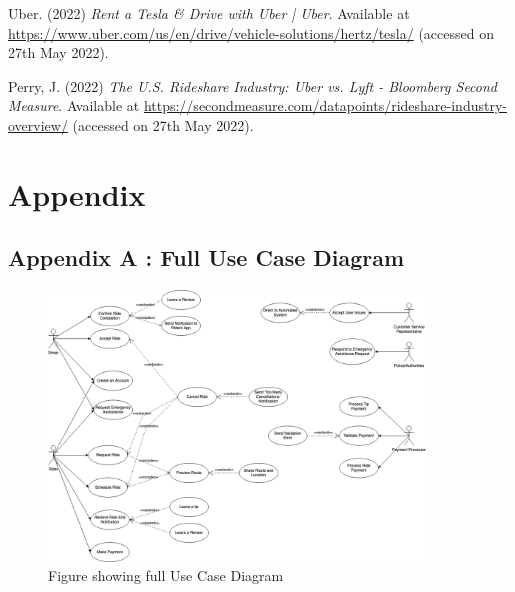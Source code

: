 \documentclass{article}
\begin{document}
    \noindent [1] Uber. (2022) \textit{Rent a Tesla \& Drive with Uber | Uber}. Available at \url{https://www.uber.com/us/en/drive/vehicle-solutions/hertz/tesla/} (accessed on 27th May 2022).
    \vspace{0.2cm}

    \noindent [2] Perry, J. (2022) \textit{The U.S. Rideshare Industry: Uber vs. Lyft - Bloomberg Second Measure}. Available at \url{https://secondmeasure.com/datapoints/rideshare-industry-overview/} (accessed on 27th May 2022).
    \vspace{0.2cm}
    \newpage

    \section{Appendix}
    \label{sec:AppendixA}
    \subsection{Appendix A : Full Use Case Diagram}
      \begin{figure}[H]
        \centering
        \includegraphics[width=10cm]{assets/use_cases.drawio.png}
        \caption{Figure showing full Use Case Diagram}
        \label{fig:fullUseCase}
      \end{figure}
    
    \newpage
\end{document}
